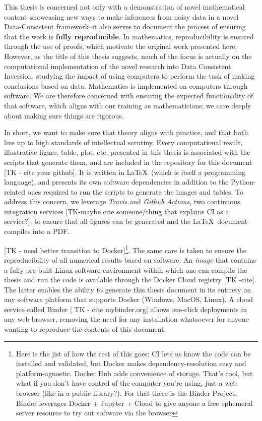 This thesis is concerned not only with a demonstration of novel mathematical content\---showcasing new ways to make inferences from noisy data in a novel Data-Consistent framework\---it also serves to document the process of ensuring that the work is \textbf{fully reproducible}.
In mathematics, reproducibility is ensured through the use of proofs, which motivate the original work presented here.
However, as the title of this thesis suggests, much of the focus is actually on the computational implementation of the novel research into Data Consistent Inversion, studying the impact of using computers to perform the task of making conclusions based on data.
Mathematics is implemented on computers through software.
We are therefore concerned with ensuring the expected functionality of that software, which aligns with our training as mathematicians; we care deeply about making sure things are rigorous.

In short, we want to make sure that theory aligns with practice, and that both live up to high standards of intellectual scrutiny.
Every computational result, illustrative figure, table, plot, etc. presented in this thesis is associated with the scripts that generate them, and are included in the  repository for this document [TK - cite your github].
It is written in \LaTeX~(which is itself a programming language), and presents its own software dependencies in addition to the Python-related ones required to run the scripts to generate the images and tables.
To address this concern, we leverage \emph{Travis} and \emph{Github Actions}, two continuous integration services [TK-maybe cite someone/thing that explains CI as a service?], to ensure that all figures can be generated and the \LaTeX\, document compiles into a PDF.

[TK - need better transition to Docker]\footnote{ Here is the jist of how the rest of this goes: CI lets us know the code can be installed and validated, but Docker makes dependency-resolution easy and platform-agnostic. Docker Hub adds convenience of storage. That's cool, but what if you don't have control of the computer you're using, just a web browser (like in a public library?). For that there is the Binder Project. Binder leverages Docker + Jupyter + Cloud to give anyone a free ephemeral server resource to try out software via the browser }.
The same care is taken to ensure the reproducibility of all numerical results based on software.
An \emph{image} that contains a fully pre-built Linux software environment within which one can compile the thesis and run the code is available through the Docker Cloud registry [TK -cite].
The latter enables the ability to generate this thesis document in its entirety on any software platform that supports Docker (Windows, MacOS, Linux).
A cloud service called Binder [ TK - cite mybinder.org] allows one-click deployments in any web-browser, removing the need for any installation whatsoever for anyone wanting to reproduce the contents of this document.

\FloatBarrier
